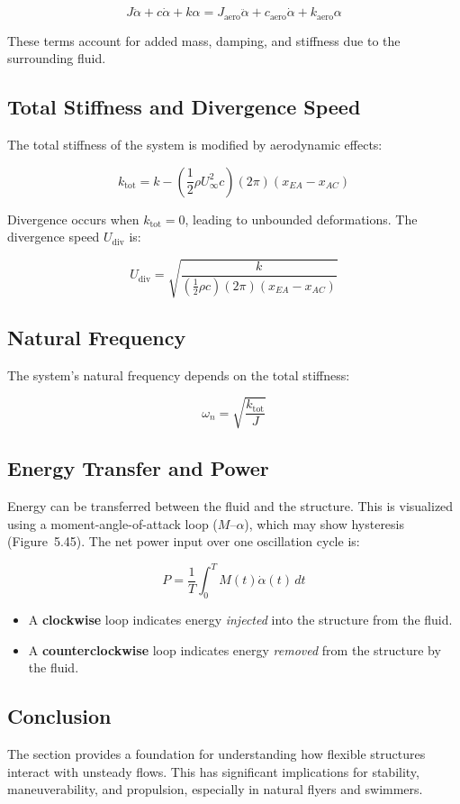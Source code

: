 \documentclass{article}
\begin{document}
\[
J \ddot{\alpha} + c \dot{\alpha} + k \alpha = J_{\text{aero}} \ddot{\alpha} + c_{\text{aero}} \dot{\alpha} + k_{\text{aero}} \alpha
\]

These terms account for added mass, damping, and stiffness due to the surrounding fluid.

\subsection*{Total Stiffness and Divergence Speed}
The total stiffness of the system is modified by aerodynamic effects:

\[
k_{\text{tot}} = k - \left( \frac{1}{2} \rho U_\infty^2 c \right)(2\pi)(x_{EA} - x_{AC})
\]

Divergence occurs when $k_{\text{tot}} = 0$, leading to unbounded deformations. The divergence speed $U_{\text{div}}$ is:

\[
U_{\text{div}} = \sqrt{ \frac{k}{\left( \frac{1}{2} \rho c \right)(2\pi)(x_{EA} - x_{AC})} }
\]

\subsection*{Natural Frequency}
The system's natural frequency depends on the total stiffness:

\[
\omega_n = \sqrt{ \frac{k_{\text{tot}}}{J} }
\]

\subsection*{Energy Transfer and Power}
Energy can be transferred between the fluid and the structure. This is visualized using a moment-angle-of-attack loop ($M$--$\alpha$), which may show hysteresis (Figure~5.45). The net power input over one oscillation cycle is:

\[
P = \frac{1}{T} \int_0^T M(t) \dot{\alpha}(t) \, dt
\]

\begin{itemize}
  \item A \textbf{clockwise} loop indicates energy \textit{injected} into the structure from the fluid.
  \item A \textbf{counterclockwise} loop indicates energy \textit{removed} from the structure by the fluid.
\end{itemize}

\subsection*{Conclusion}
The section provides a foundation for understanding how flexible structures interact with unsteady flows. This has significant implications for stability, maneuverability, and propulsion, especially in natural flyers and swimmers.
\end{document}
